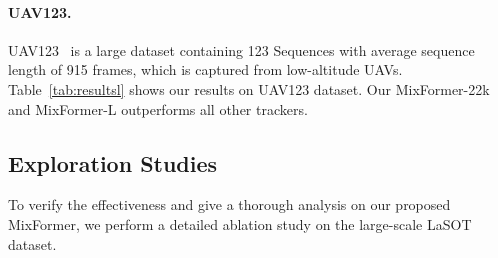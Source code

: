\paragraph{UAV123.}
UAV123~\cite{uav123} is a large dataset containing 123 Sequences with average sequence length of 915 frames, which is captured from low-altitude UAVs. Table~\ref{tab:resultsl} shows our results on UAV123 dataset. Our MixFormer-22k and MixFormer-L outperforms all other trackers.

\subsection{Exploration Studies}
To verify the effectiveness and give a thorough analysis on our proposed MixFormer, we perform a detailed ablation study on the large-scale LaSOT dataset.
\vspace{-4mm}
